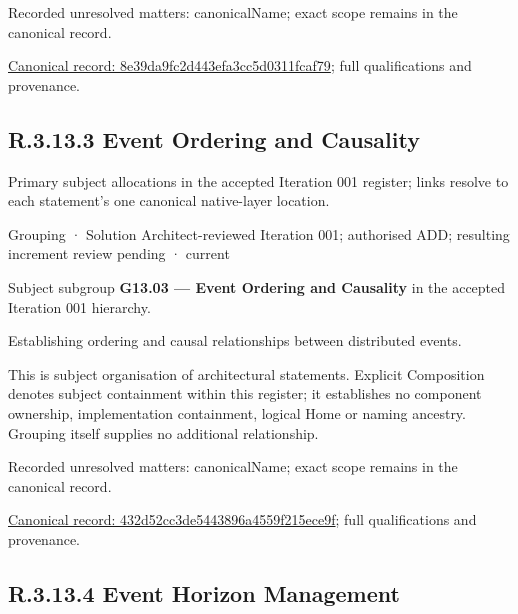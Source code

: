 {\small Recorded unresolved matters: canonicalName; exact scope remains in the canonical record.}\par
{\footnotesize \href{../../../../continuum/grouping/8e39da9fc2d443efa3cc5d0311fcaf79.md}{Canonical record: 8e39da9fc2d443efa3cc5d0311fcaf79}; full qualifications and provenance.}\par
\subsection*{R.3.13.3 Event Ordering and Causality}
\label{navigation:R.3.13.3}

Primary subject allocations in the accepted Iteration 001 register; links resolve to each statement’s one canonical native-layer location.\par
\label{element:432d52cc3de5443896a4559f215ece9f}
{\small Grouping · Solution Architect-reviewed Iteration 001; authorised ADD; resulting increment review pending · current}\par

Subject subgroup \textbf{G13.03 — Event Ordering and Causality} in the accepted Iteration 001 hierarchy.



Establishing ordering and causal relationships between distributed events.



This is subject organisation of architectural statements. Explicit Composition denotes subject containment within this register; it establishes no component ownership, implementation containment, logical Home or naming ancestry. Grouping itself supplies no additional relationship.


{\small Recorded unresolved matters: canonicalName; exact scope remains in the canonical record.}\par
{\footnotesize \href{../../../../continuum/grouping/432d52cc3de5443896a4559f215ece9f.md}{Canonical record: 432d52cc3de5443896a4559f215ece9f}; full qualifications and provenance.}\par
\subsection*{R.3.13.4 Event Horizon Management}
\label{navigation:R.3.13.4}


